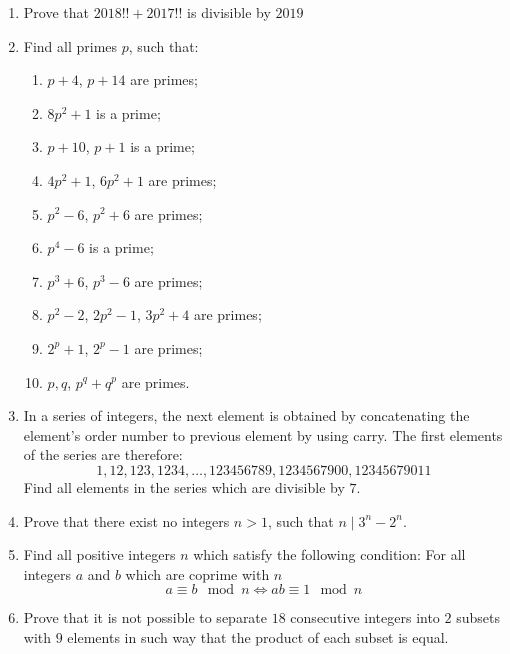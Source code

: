\documentclass{article}
\begin{document}
\begin{enumerate}
	\item 
	Prove that $2018!! + 2017!!$ is divisible by $2019$
	
	\item 
	Find all primes $p$, such that:
	\begin{enumerate}
		\item  $p+4$, $p+14$ are primes;
		\item $8p^2+1$ is a prime;
		\item $p+10$, $p+1$ is a prime;
		\item $4p^2+1$, $6p^2+1$ are primes;
		\item $p^2-6$, $p^2+6$ are primes;
		\item $p^4-6$ is a prime;
		\item $p^3+6$, $p^3-6$ are primes;
		\item $p^2-2$, $2p^2-1$, $3p^2+4$ are primes;
		\item $2^p+1$, $2^p-1$ are primes;
		\item $p,q$, $p^q+q^p$ are primes.
	\end{enumerate}
	
	\item 
	In a series of integers, the next element is obtained by concatenating the element's order number to previous element by using carry. The first elements of the series are therefore:
	$${1,12,123,1234,\dots,123456789,1234567900,12345679011} $$
	Find all elements in the series which are divisible by $7$.
	
	\item 
	Prove that there exist no integers $n>1$, such that $n \mid 3^n-2^n$.
	
	\item 
	Find all positive integers $n$ which satisfy the following condition:
	For all integers $a$ and $b$ which are coprime with $n$
	$$ a \equiv b  \mod n \iff ab \equiv 1 \mod n$$

	\item
	Prove that it is not possible to separate $18$ consecutive integers into $2$ subsets with $9$ elements in such way that the product of each subset is equal.
\end{enumerate}
\end{document}
